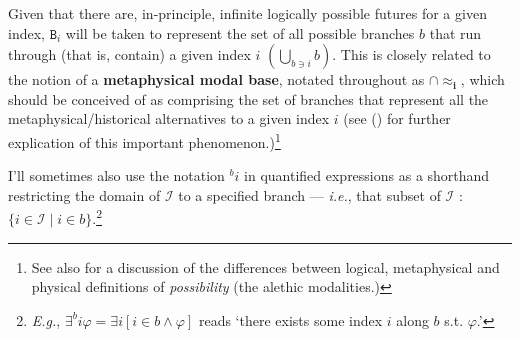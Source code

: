 \documentclass[12pt,dvipsnames]{report}
\begin{document}
\xe


Given that there are, in-principle, infinite logically possible futures for a given index,  $ \mathtt{B}_i $ will be taken to represent the set of all possible branches $ b $ that run through (that is, contain) a given index $ i $ $(\bigcup\limits_{b\scriptstyle\ni i}b)$. This is closely related to the notion of a \textbf{metaphysical modal base}, notated throughout as $ \boldsymbol{\cap{\approx_i}} $, which should be conceived of as comprising the set of branches that represent all the metaphysical/historical alternatives to a given index $ i $ (see () for further explication of this important phenomenon.)\footnote{See also \citet{Rumberg2016a} for a discussion of the differences between logical, metaphysical and physical definitions of \textit{possibility} (the alethic modalities.)}

 I'll sometimes also use the notation $ {}^bi $ in quantified expressions as a shorthand restricting the domain of $ \mathcal I $ to a specified branch --- \textit{i.e.}, that subset of $ \mathcal I $ : $ \{i\in\mathcal I\mid i\in b\} $.\footnote{\textit{E.g.}, $ \exists^bi\varphi=\exists i[i\in b\wedge\varphi]$ reads `there exists some index $ i $ along $ b $ s.t. $ \varphi $.'}
\end{document}
